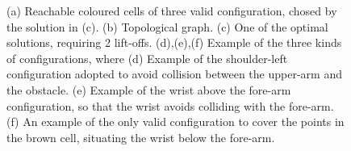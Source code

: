 \documentclass[journal]{IEEEtran}
\begin{document}
\begin{figure}[t]
\centering
{}
\caption{(a) Reachable coloured cells of three valid configuration, chosed by the solution in (c). 
(b) Topological graph. (c) One of the optimal solutions, requiring 2 lift-offs. 
(d),(e),(f) Example of the three kinds of configurations, where
(d) Example of the shoulder-left configuration adopted to avoid collision between the upper-arm and the obstacle. 
(e) Example of the wrist above the fore-arm configuration, so that the wrist avoids colliding with the fore-arm. 
(f) An example of the only valid configuration to cover the points in the brown cell, situating the wrist below the fore-arm.}
\label{fig_realworld_with}
\end{figure}
\end{document}
